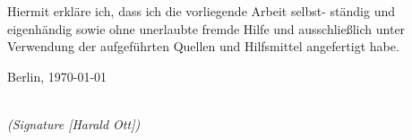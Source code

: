 \newpage

\thispagestyle{empty}

\begin{large}

\vspace*{6cm}

\noindent Hiermit erkl\"are ich, dass ich die vorliegende Arbeit selbst-
st\"andig und eigenh\"andig sowie ohne unerlaubte fremde Hilfe
und ausschlie{\ss}lich unter Verwendung der aufgef\"uhrten 
Quellen und Hilfsmittel angefertigt habe.
\vspace{2cm}

\noindent
Berlin, \today

\vspace{3cm}

\hspace*{7cm}%
\dotfill\\
\hspace*{8.5cm}%
\textit{(Signature [Harald Ott])}

\end{large}

